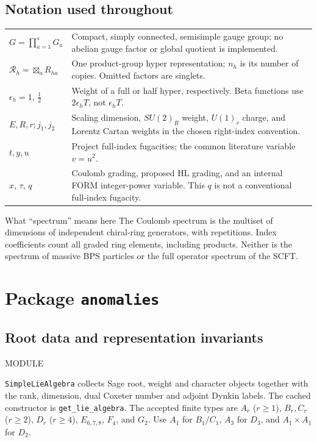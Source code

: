 \documentclass[11pt,a4paper]{article}
\numberwithin{equation}{section}
\newcommand{\code}[1]{{\small\nolinkurl{#1}}}
\newcommand{\file}[1]{\par{\small\sffamily\color{muted}MODULE \quad\texttt{\detokenize{#1}}}\par}
\begin{document}
\subsection*{Notation used throughout}
\begin{tabularx}{\textwidth}{@{}p{30mm}Y@{}}
$G=\prod_{a=1}^{s}G_a$ & Compact, simply connected, semisimple gauge group; no abelian
gauge factor or global quotient is implemented.\\
$\mathcal R_h=\boxtimes_a R_{ha}$ & One product-group hyper representation;
$n_h$ is its number of copies. Omitted factors are singlets.\\
$\epsilon_h=1,\,\tfrac12$ & Weight of a full or half hyper, respectively. Beta
functions use $2\epsilon_h T$, not $\epsilon_h T$.\\
$E,R,r;j_1,j_2$ & Scaling dimension, $SU(2)_R$ weight, $U(1)_r$ charge, and Lorentz
Cartan weights in the chosen right-index convention.\\
$t,y,u$ & Project full-index fugacities; the common literature variable $v=u^2$.\\
$x$, $\tau$, $q$ & Coulomb grading, proposed HL grading, and an internal FORM
integer-power variable. This $q$ is not a conventional full-index fugacity.\\
\end{tabularx}

\begin{note}{What ``spectrum'' means here}
The Coulomb spectrum is the multiset of dimensions of independent chiral-ring
generators, with repetitions. Index coefficients count all graded ring elements,
including products. Neither is the spectrum of massive BPS particles or the full
operator spectrum of the SCFT.
\end{note}

\clearpage
\section{Package \texttt{anomalies}}\label{sec:anomalies}
\subsection{Root data and representation invariants}
\file{anomalies/lie_algebra.py}
\code{SimpleLieAlgebra} collects Sage root, weight and character objects together
with the rank, dimension, dual Coxeter number and adjoint Dynkin labels. The
cached constructor is \code{get_lie_algebra}. The accepted finite types are
$A_r$ ($r\geq1$), $B_r,C_r$ ($r\geq2$), $D_r$ ($r\geq4$),
$E_{6,7,8}$, $F_4$, and $G_2$. Use $A_1$ for $B_1/C_1$, $A_3$ for $D_3$,
and $A_1\times A_1$ for $D_2$.
\end{document}

